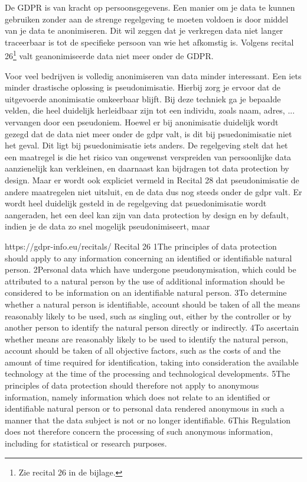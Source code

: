 De GDPR is van kracht op persoonsgegevens. Een manier om je data te kunnen gebruiken zonder aan de strenge regelgeving te moeten voldoen is door middel van je data te anonimiseren. Dit wil zeggen dat je verkregen data niet langer traceerbaar is tot de specifieke persoon van wie het afkomstig is. Volgens recital 26\footnote{Zie recital 26 in de bijlage.} valt geanonimiseerde data niet meer onder de GDPR. 

Voor veel bedrijven is volledig anonimiseren van data minder interessant. Een iets minder drastische oplossing is pseudonimisatie. Hierbij zorg je ervoor dat de uitgevoerde anonimisatie omkeerbaar blijft.  
Bij deze techniek ga je bepaalde velden, die heel duidelijk herleidbaar zijn tot een individu, zoals naam, adres, ... vervangen door een pseudoniem.
Hoewel er bij anonimisatie duidelijk wordt gezegd dat de data niet meer onder de gdpr valt, is dit bij psuedonimisatie niet het geval. Dit ligt bij psuedonimisatie iets anders. De regelgeving stelt dat het een maatregel is die het risico van ongewenst verspreiden van persoonlijke data aanzienelijk kan verkleinen, en daarnaast kan bijdragen tot data protection by design. Maar er wordt ook expliciet vermeld in Recital 28 dat pseudonimisatie de andere maatregelen niet uitsluit, en de data dus nog steeds onder de gdpr valt. 
Er wordt heel duidelijk gesteld in de regelgeving dat psuedonimisatie wordt aangeraden, het een deel kan zijn van data protection by design en by default, indien je de data zo snel mogelijk pseudonimiseert, maar 

https://gdpr-info.eu/recitals/
Recital 26
1The principles of data protection should apply to any information concerning an identified or identifiable natural person. 2Personal data which have undergone pseudonymisation, which could be attributed to a natural person by the use of additional information should be considered to be information on an identifiable natural person. 3To determine whether a natural person is identifiable, account should be taken of all the means reasonably likely to be used, such as singling out, either by the controller or by another person to identify the natural person directly or indirectly. 4To ascertain whether means are reasonably likely to be used to identify the natural person, account should be taken of all objective factors, such as the costs of and the amount of time required for identification, taking into consideration the available technology at the time of the processing and technological developments. 5The principles of data protection should therefore not apply to anonymous information, namely information which does not relate to an identified or identifiable natural person or to personal data rendered anonymous in such a manner that the data subject is not or no longer identifiable. 6This Regulation does not therefore concern the processing of such anonymous information, including for statistical or research purposes.

